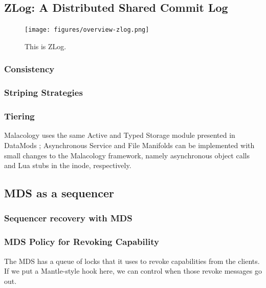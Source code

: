 \documentclass[10pt,twocolumn]{article}
\begin{document}
\subsection{ZLog: A Distributed Shared Commit
Log}\label{zlog-a-distributed-shared-commit-log}

\begin{figure}[htbp]
\centering
\texttt{[image: figures/overview-zlog.png]}
\caption{This is ZLog.}
\end{figure}

\subsubsection{Consistency}\label{consistency}

\subsubsection{Striping Strategies}\label{striping-strategies}

\subsubsection{Tiering}\label{tiering}

Malacology uses the same Active and Typed Storage module presented in
DataMods \autocite{watkins_datamods_2012}; Asynchronous Service and File
Manifolds can be implemented with small changes to the Malacology
framework, namely asynchronous object calls and Lua stubs in the inode,
respectively.

\subsection{MDS as a sequencer}\label{mds-as-a-sequencer}

\subsubsection{Sequencer recovery with
MDS}\label{sequencer-recovery-with-mds}

\subsubsection{MDS Policy for Revoking
Capability}\label{mds-policy-for-revoking-capability}

The MDS has a queue of locks that it uses to revoke capabilities from
the clients. If we put a Mantle-style hook here, we can control when
those revoke messages go out.
\end{document}
